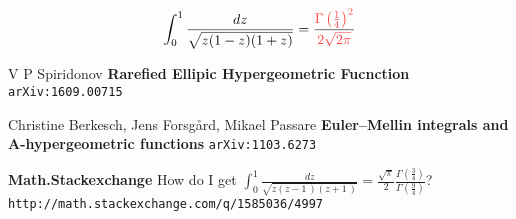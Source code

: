 \documentclass[12pt]{article}
\begin{document}
$$ \int_{0}^{1} \frac{dz}{\sqrt{z(1-z)(1+z)}} = {\frac{\color{red!75!white} \Gamma\left(\frac{1}{4}\right)^2}{\color{red!75!white} 2\sqrt{2\pi}}} $$

\selectfont \fontsize{12}{10}\selectfont

\begin{thebibliography}{}

\item V P Spiridonov  \textbf{Rarefied Ellipic Hypergeometric Fucnction} \texttt{arXiv:1609.00715}

\item Christine Berkesch, Jens Forsg\aa{}rd, Mikael Passare
\textbf{Euler--Mellin integrals and A-hypergeometric functions} \texttt{arXiv:1103.6273}

\item \textbf{Math.Stackexchange} How do I get $ \int_0^1 \frac{dz}{\sqrt{z(z - 1\,)(z+1\,)}} = \frac{\sqrt{\pi}}{2} \frac{\Gamma(\frac{3}{4})}{\Gamma(\frac{9}{4})}$? \\ \texttt{http://math.stackexchange.com/q/1585036/4997}

\end{thebibliography}
\end{document}
